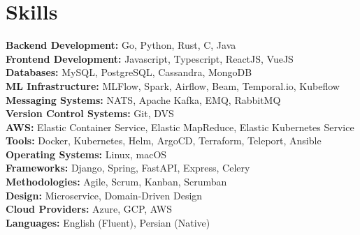 \section*{Skills}
\textbf{Backend Development:} Go, Python, Rust, C, Java\\
\textbf{Frontend Development:} Javascript, Typescript, ReactJS, VueJS\\
\textbf{Databases:} MySQL, PostgreSQL, Cassandra, MongoDB\\
\textbf{ML Infrastructure:} MLFlow, Spark, Airflow, Beam, Temporal.io, Kubeflow \\
\textbf{Messaging Systems:} NATS, Apache Kafka, EMQ, RabbitMQ \\
\textbf{Version Control Systems:} Git, DVS \\
\textbf{AWS:} Elastic Container Service, Elastic MapReduce, Elastic Kubernetes Service \\
\textbf{Tools:} Docker, Kubernetes, Helm, ArgoCD, Terraform, Teleport, Ansible \\
\textbf{Operating Systems:} Linux, macOS \\
\textbf{Frameworks:} Django, Spring, FastAPI, Express, Celery \\
\textbf{Methodologies:} Agile, Scrum, Kanban, Scrumban \\
\textbf{Design:} Microservice, Domain-Driven Design \\
\textbf{Cloud Providers:} Azure, GCP, AWS \\
\textbf{Languages:} English (Fluent), Persian (Native) \\